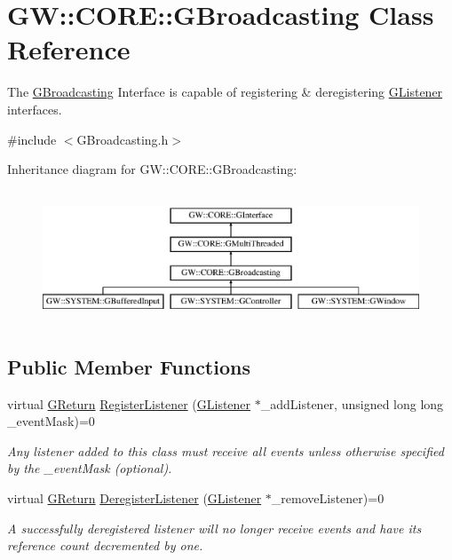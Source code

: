 \hypertarget{class_g_w_1_1_c_o_r_e_1_1_g_broadcasting}{}\section{GW\+:\+:C\+O\+RE\+:\+:G\+Broadcasting Class Reference}
\label{class_g_w_1_1_c_o_r_e_1_1_g_broadcasting}


The \mbox{\hyperlink{class_g_w_1_1_c_o_r_e_1_1_g_broadcasting}{G\+Broadcasting}} Interface is capable of registering \& deregistering \mbox{\hyperlink{class_g_w_1_1_c_o_r_e_1_1_g_listener}{G\+Listener}} interfaces.  




{\ttfamily \#include $<$G\+Broadcasting.\+h$>$}

Inheritance diagram for GW\+:\+:C\+O\+RE\+:\+:G\+Broadcasting\+:\begin{figure}[H]
\begin{center}
\leavevmode
\includegraphics[height=3.971631cm]{class_g_w_1_1_c_o_r_e_1_1_g_broadcasting}
\end{center}
\end{figure}
\subsection*{Public Member Functions}
\begin{DoxyCompactItemize}
\item 
virtual \mbox{\hyperlink{namespace_g_w_a67a839e3df7ea8a5c5686613a7a3de21}{G\+Return}} \mbox{\hyperlink{class_g_w_1_1_c_o_r_e_1_1_g_broadcasting_a293251421ba1169016f722df2f5b573b}{Register\+Listener}} (\mbox{\hyperlink{class_g_w_1_1_c_o_r_e_1_1_g_listener}{G\+Listener}} $\ast$\+\_\+add\+Listener, unsigned long long \+\_\+event\+Mask)=0
\begin{DoxyCompactList}\small\item\em Any listener added to this class must receive all events unless otherwise specified by the \+\_\+event\+Mask (optional). \end{DoxyCompactList}\item 
virtual \mbox{\hyperlink{namespace_g_w_a67a839e3df7ea8a5c5686613a7a3de21}{G\+Return}} \mbox{\hyperlink{class_g_w_1_1_c_o_r_e_1_1_g_broadcasting_afd6b1f41b646c668b1fcce2580681dd5}{Deregister\+Listener}} (\mbox{\hyperlink{class_g_w_1_1_c_o_r_e_1_1_g_listener}{G\+Listener}} $\ast$\+\_\+remove\+Listener)=0
\begin{DoxyCompactList}\small\item\em A successfully deregistered listener will no longer receive events and have its reference count decremented by one. \end{DoxyCompactList}\end{DoxyCompactItemize}


